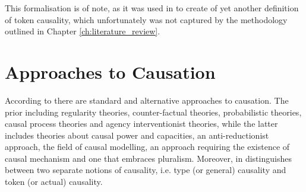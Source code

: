 \documentclass[11pt,a4paper]{book}
\theoremstyle{definition}
\theoremstyle{definition}
\theoremstyle{definition}
\theoremstyle{remark}
\begin{document}
This formalisation is of note, as it was used in \parencite{erwig2010causal} to create of yet another definition of token causality, which unfortunately was not captured by the methodology outlined in Chapter \ref{ch:literature_review}. 


\section{Approaches to Causation}
\label{sec:causation:approaches_to_causation}
%
%

According to \cite{beebee2009oxford} there are standard and alternative approaches to causation. The prior including regularity theories, counter-factual theories, probabilistic theories, causal process theories and agency interventionist theories, while the latter includes theories about causal power and capacities, an anti-reductionist approach, the field of causal modelling, an approach requiring the existence of causal mechanism and one that embraces pluralism. Moreover, in \cite{halpern2016actual} distinguishes between two separate notions of causality, i.e. type (or general) causality and token (or actual) causality. 
\end{document}
